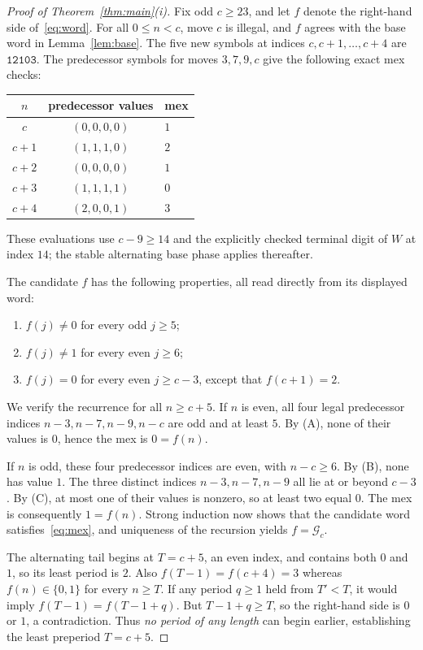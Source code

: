 \documentclass[10pt,a4paper]{article}
\newcommand{\SG}{\mathcal{G}}
\newcommand{\word}[1]{\mathtt{#1}}
\begin{document}
\begin{proof}[Proof of Theorem~\ref{thm:main}(i)]
Fix odd $c\ge23$, and let $f$ denote the right-hand side of~\eqref{eq:word}. For all $0\le n<c$, move $c$ is illegal, and $f$ agrees with the base word in Lemma~\ref{lem:base}. The five new symbols at indices $c,c+1,\ldots,c+4$ are $\word{12103}$. The predecessor symbols for moves $3,7,9,c$ give the following exact mex checks:
\begin{center}
\begin{tabular}{ccl}
\toprule
$n$ & predecessor values & mex\\
\midrule
$c$ & $(0,0,0,0)$ & $1$\\
$c+1$ & $(1,1,1,0)$ & $2$\\
$c+2$ & $(0,0,0,0)$ & $1$\\
$c+3$ & $(1,1,1,1)$ & $0$\\
$c+4$ & $(2,0,0,1)$ & $3$\\
\bottomrule
\end{tabular}
\end{center}
These evaluations use $c-9\ge14$ and the explicitly checked terminal digit of $W$ at index $14$; the stable alternating base phase applies thereafter.

The candidate $f$ has the following properties, all read directly from its displayed word:
\begin{enumerate}[label=(\Alph*)]
\item $f(j)\ne0$ for every odd $j\ge5$;
\item $f(j)\ne1$ for every even $j\ge6$;
\item $f(j)=0$ for every even $j\ge c-3$, except that $f(c+1)=2$.
\end{enumerate}
We verify the recurrence for all $n\ge c+5$. If $n$ is even, all four legal predecessor indices $n-3,n-7,n-9,n-c$ are odd and at least $5$. By (A), none of their values is $0$, hence the mex is $0=f(n)$.

If $n$ is odd, these four predecessor indices are even, with $n-c\ge6$. By (B), none has value $1$. The three distinct indices $n-3,n-7,n-9$ all lie at or beyond $c-3$. By (C), at most one of their values is nonzero, so at least two equal $0$. The mex is consequently $1=f(n)$. Strong induction now shows that the candidate word satisfies~\eqref{eq:mex}, and uniqueness of the recursion yields $f=\SG_c$.

The alternating tail begins at $T=c+5$, an even index, and contains both $0$ and $1$, so its least period is $2$. Also $f(T-1)=f(c+4)=3$ whereas $f(n)\in\{0,1\}$ for every $n\ge T$. If any period $q\ge1$ held from $T'<T$, it would imply $f(T-1)=f(T-1+q)$. But $T-1+q\ge T$, so the right-hand side is $0$ or $1$, a contradiction. Thus \emph{no period of any length} can begin earlier, establishing the least preperiod $T=c+5$.
\end{proof}
\end{document}
